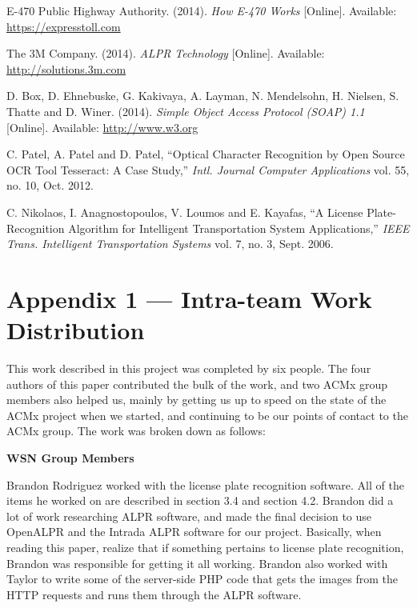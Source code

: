\documentclass[11pt, oneside, fullpage, doublespace]{article}
\begin{document}
\begin{thebibliography}{99}
 E-470 Public Highway Authority. (2014). \emph{How E-470 Works} [Online]. Available: \url{https://expresstoll.com}

 The 3M Company. (2014). \emph{ALPR Technology} [Online]. Available: \url{http://solutions.3m.com}

 D. Box, D. Ehnebuske, G. Kakivaya, A. Layman, N. Mendelsohn, H. Nielsen, S. Thatte and D. Winer. (2014). \emph{Simple Object Access Protocol (SOAP) 1.1} [Online]. Available: \url{http://www.w3.org}

 C. Patel, A. Patel and D. Patel, ``Optical Character Recognition by Open Source OCR Tool Tesseract: A Case Study,'' \emph{Intl. Journal Computer Applications} vol. 55, no. 10, Oct. 2012.

 C. Nikolaos, I. Anagnostopoulos, V. Loumos and E. Kayafas, ``A License Plate-Recognition Algorithm for Intelligent Transportation System Applications,'' \emph{IEEE Trans. Intelligent Transportation Systems} vol. 7, no. 3, Sept. 2006.

\end{thebibliography}


\section*{Appendix 1 --- Intra-team Work Distribution}

This work described in this project was completed by six people. The four authors of this paper contributed the bulk of the work, and two ACMx group members also helped us, mainly by getting us up to speed on the state of the ACMx project when we started, and continuing to be our points of contact to the ACMx group. The work was broken down as follows:

\textbf{WSN Group Members}

Brandon Rodriguez worked with the license plate recognition software. All of the items he worked on are described in section 3.4 and section 4.2. Brandon did a lot of work researching ALPR software, and made the final decision to use OpenALPR and the Intrada ALPR software for our project. Basically, when reading this paper, realize that if something pertains to license plate recognition, Brandon was responsible for getting it all working. Brandon also worked with Taylor to write some of the server-side PHP code that gets the images from the HTTP requests and runs them through the ALPR software.
\end{document}
